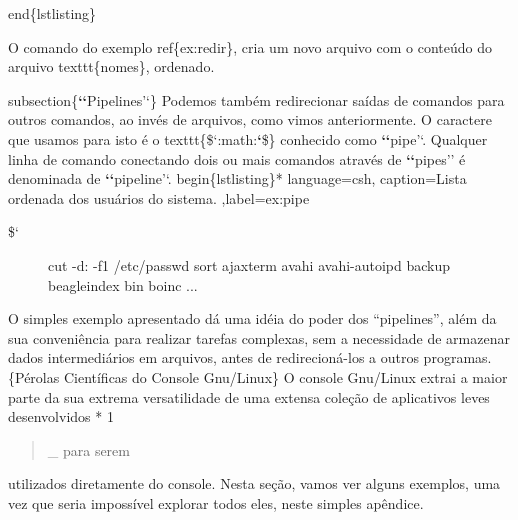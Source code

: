 \documentclass[a4paper,10pt,brazil]{sphinxmanual}
\begin{document}
end\{lstlisting\}

O comando do exemplo ref\{ex:redir\}, cria um novo arquivo com o conteúdo do arquivo texttt\{nomes\}, ordenado.

subsection\{{\color{red}\bfseries{}{}`{}`}Pipelines'`\}
Podemos também redirecionar saídas de comandos para outros comandos, ao invés de arquivos, como vimos anteriormente. O caractere que usamos para isto é o texttt\{\${}`:math:{\color{red}\bfseries{}{}`}\$\} conhecido como {\color{red}\bfseries{}{}`{}`}pipe'`. Qualquer linha de comando conectando dois ou mais comandos através de {\color{red}\bfseries{}{}`{}`}pipes'' é denominada de {\color{red}\bfseries{}{}`{}`}pipeline'`.
begin\{lstlisting\}* language=csh, caption=Lista ordenada dos usuários do sistema. ,label=ex:pipe
\begin{description}
\item[{\${}`}] \leavevmode
cut -d: -f1 /etc/passwd sort ajaxterm avahi avahi-autoipd backup
beagleindex bin boinc ...

\end{description}

O simples exemplo apresentado dá uma idéia do poder dos
``pipelines'', além da sua conveniência para realizar tarefas
complexas, sem a necessidade de armazenar dados intermediários em
arquivos, antes de redirecioná-los a outros programas.
\{Pérolas Científicas do Console Gnu/Linux\} O console Gnu/Linux
extrai a maior parte da sua extrema versatilidade de uma extensa
coleção de aplicativos leves desenvolvidos * 1
\begin{quote}

\_ para serem
\end{quote}

utilizados diretamente do console. Nesta seção, vamos ver alguns
exemplos, uma vez que seria impossível explorar todos eles, neste
simples apêndice.
\end{document}
